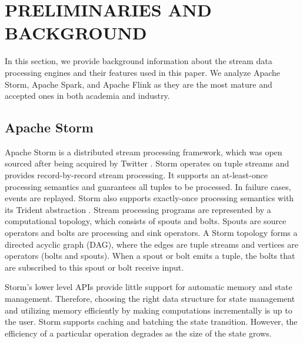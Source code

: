 \section{PRELIMINARIES AND BACKGROUND}
\label{pre}

In this section, we provide background information about the stream data processing engines and their features used in this paper. We analyze Apache Storm, Apache Spark, and Apache Flink as they are the most mature and accepted ones in both academia and  industry.

\subsection{Apache Storm}

Apache Storm is a distributed stream processing framework, which was open sourced after being acquired by Twitter \cite{storm}. %
Storm operates on tuple streams and provides record-by-record stream processing. It supports an at-least-once processing  semantics and guarantees all tuples to be processed. In failure cases, events are replayed. Storm also supports exactly-once processing semantics with its Trident abstraction \cite{trident}. %
Stream processing programs are represented by a computational topology, which consists of spouts and bolts. Spouts are source operators and bolts are processing and sink operators. A Storm topology forms a directed acyclic graph (DAG), where the edges are tuple streams and vertices are operators (bolts and spouts). When a spout or bolt emits a tuple, the bolts that are subscribed to this spout or bolt receive input. 

Storm's lower level APIs provide little support for automatic memory and state management. Therefore, choosing the right data structure for state management and utilizing memory efficiently by making computations incrementally  is up to the user. Storm supports caching and batching the state transition. However, the efficiency of a particular operation degrades as the size of the state grows. 


